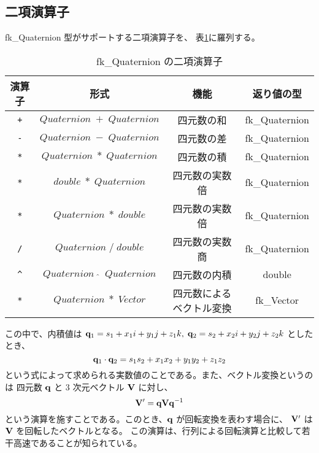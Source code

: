 \subsection{二項演算子}
fk\_Quaternion 型がサポートする二項演算子を、
表\ref{tbl:fkQ2}に羅列する。
\begin{table}[H]
\caption{fk\_Quaternion の二項演算子}
\label{tbl:fkQ2}
\begin{center}
\begin{tabular}{|c|c|c|c|}
\hline
演算子 & 形式 & 機能 & 返り値の型 \\ \hline \hline
\verb-+- & \(Quaternion \; + \; Quaternion\) &
	四元数の和 & fk\_Quaternion \\ \hline
\verb+-+ & \(Quaternion \; - \; Quaternion\) &
	四元数の差 & fk\_Quaternion \\ \hline
\verb+*+ & \(Quaternion \; * \; Quaternion\) &
	四元数の積 & fk\_Quaternion \\ \hline
\verb+*+ & \(double \; * \; Quaternion\) &
	四元数の実数倍 & fk\_Quaternion \\ \hline
\verb+*+ & \(Quaternion \; * \; double\) &
	四元数の実数倍 & fk\_Quaternion \\ \hline
\verb+/+ & \(Quaternion \; / \; double\) &
	四元数の実数商 & fk\_Quaternion \\ \hline
\verb+^+ & \(Quaternion \;\; \hat{} \;\; Quaternion\) &
	四元数の内積 & double \\ \hline
\verb+*+ & \(Quaternion \; * \; Vector\) &
	四元数によるベクトル変換 & fk\_Vector \\ \hline
\end{tabular}
\end{center}
\end{table}
この中で、内積値は \(\mathbf{q}_1 = s_1 + x_1i + y_1j + z_1k, \;
\mathbf{q}_2 = s_2 + x_2i + y_2j + z_2k\) としたとき、
\[
	\mathbf{q}_1\cdot\mathbf{q}_2 = s_1s_2 + x_1x_2 + y_1y_2 + z_1z_2
\]
という式によって求められる実数値のことである。また、ベクトル変換というのは
四元数 \(\mathbf{q}\) と 3 次元ベクトル \(\mathbf{V}\) に対し、
\[
	\mathbf{V}' = \mathbf{q}\mathbf{V}\mathbf{q}^{-1}
\]
という演算を施すことである。このとき、\(\mathbf{q}\) が回転変換を表わす場合に、
\(\mathbf{V}'\) は \(\mathbf{V}\) を回転したベクトルとなる。
この演算は、行列による回転演算と比較して若干高速であることが知られている。

